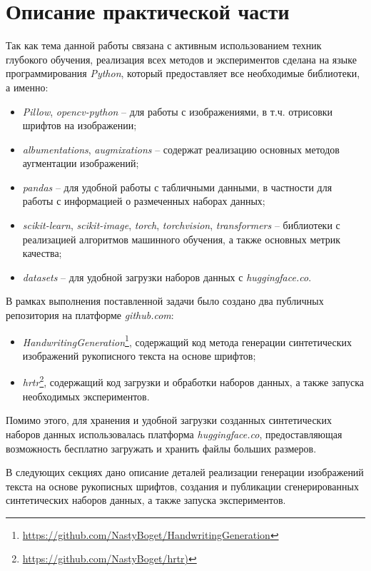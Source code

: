 \section{Описание практической части}
\label{sec:Chapter4} 

Так как тема данной работы связана с активным использованием техник глубокого обучения, реализация всех методов и экспериментов
сделана на языке программирования \textit{Python}, который предоставляет все необходимые библиотеки, а именно:
\begin{itemize}
    \item \textit{Pillow}, \textit{opencv-python} -- для работы с изображениями, в т.ч. отрисовки шрифтов на изображении;
    \item \textit{albumentations}, \textit{augmixations} -- содержат реализацию основных методов аугментации изображений;
    \item \textit{pandas} -- для удобной работы с табличными данными, в частности для работы с информацией о размеченных наборах данных;
    \item \textit{scikit-learn}, \textit{scikit-image}, \textit{torch}, \textit{torchvision}, \textit{transformers} -- библиотеки с реализацией алгоритмов машинного обучения, а также основных метрик качества;
    \item \textit{datasets} -- для удобной загрузки наборов данных с \textit{huggingface.co}.
\end{itemize}

В рамках выполнения поставленной задачи было создано два публичных репозитория на платформе \textit{github.com}:
\begin{itemize}
    \item \textit{HandwritingGeneration}\footnote{\url{https://github.com/NastyBoget/HandwritingGeneration}}, содержащий код метода генерации синтетических изображений рукописного текста на основе шрифтов;
    \item \textit{hrtr}\footnote{\url{https://github.com/NastyBoget/hrtr)}}, содержащий код загрузки и обработки наборов данных, а также запуска необходимых экспериментов.
\end{itemize}

Помимо этого, для хранения и удобной загрузки созданных синтетических наборов данных использовалась платформа \textit{huggingface.co},
предоставляющая возможность бесплатно загружать и хранить файлы больших размеров.

В следующих секциях дано описание деталей реализации генерации изображений текста на основе рукописных шрифтов,
создания и публикации сгенерированных синтетических наборов данных, а также запуска экспериментов.


